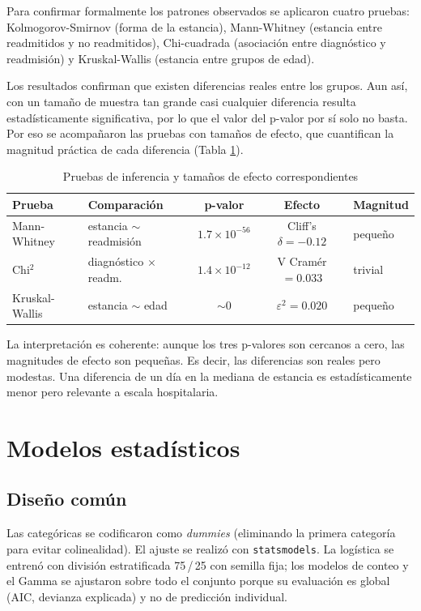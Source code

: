 \documentclass[11pt]{article}
\begin{document}
Para confirmar formalmente los patrones observados se aplicaron cuatro pruebas: Kolmogorov-Smirnov (forma de la estancia), Mann-Whitney (estancia entre readmitidos y no readmitidos), Chi-cuadrada (asociación entre diagnóstico y readmisión) y Kruskal-Wallis (estancia entre grupos de edad).

Los resultados confirman que existen diferencias reales entre los grupos. Aun así, con un tamaño de muestra tan grande casi cualquier diferencia resulta estadísticamente significativa, por lo que el valor del p-valor por sí solo no basta. Por eso se acompañaron las pruebas con tamaños de efecto, que cuantifican la magnitud práctica de cada diferencia (Tabla \ref{tab:effects}).

\begin{table}[H]
\centering
\small
\caption{Pruebas de inferencia y tamaños de efecto correspondientes}
\label{tab:effects}
\begin{tabular}{llccl}
\toprule
Prueba & Comparación & p-valor & Efecto & Magnitud \\
\midrule
Mann-Whitney   & estancia $\sim$ readmisión   & $1.7\times 10^{-56}$ & Cliff's $\delta = -0.12$ & pequeño \\
Chi$^2$        & diagnóstico $\times$ readm.  & $1.4\times 10^{-12}$ & V Cramér $= 0.033$       & trivial \\
Kruskal-Wallis & estancia $\sim$ edad         & $\sim 0$             & $\varepsilon^2 = 0.020$  & pequeño \\
\bottomrule
\end{tabular}
\end{table}

La interpretación es coherente: aunque los tres p-valores son cercanos a cero, las magnitudes de efecto son pequeñas. Es decir, las diferencias son reales pero modestas. Una diferencia de un día en la mediana de estancia es estadísticamente menor pero relevante a escala hospitalaria.

\section{Modelos estadísticos}

\subsection*{Diseño común}

Las categóricas se codificaron como \textit{dummies} (eliminando la primera categoría para evitar colinealidad). El ajuste se realizó con \texttt{statsmodels}. La logística se entrenó con división estratificada 75\,/\,25 con semilla fija; los modelos de conteo y el Gamma se ajustaron sobre todo el conjunto porque su evaluación es global (AIC, devianza explicada) y no de predicción individual.
\end{document}

